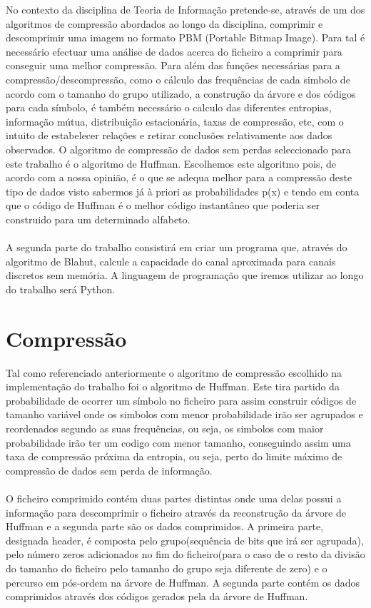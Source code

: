 No contexto da disciplina de Teoria de Informação pretende-se, através de um dos algoritmos de compressão abordados ao longo da disciplina, comprimir e descomprimir uma imagem no formato PBM (Portable Bitmap Image). Para tal é necessário efectuar uma análise de dados acerca do ficheiro a comprimir para conseguir uma melhor compressão. Para além das funções necessárias para a compressão/descompressão, como o cálculo das frequências de cada simbolo de acordo com o tamanho do grupo utilizado, a construção da árvore e dos códigos para cada símbolo, é também necessário o calculo das diferentes entropias, informação mútua, distribuição estacionária, taxas de compressão, etc, com o intuito de estabelecer relações e retirar conclusões relativamente aos dados observados. O algoritmo de compressão de dados sem perdas seleccionado para este trabalho é o algoritmo de Huffman. Escolhemos este algoritmo pois, de acordo com a nossa opinião, é o que se adequa melhor para a compressão deste tipo de dados visto sabermos já à priori as probabilidades p(x) e tendo em conta que o código de Huffman é o melhor código instantâneo que poderia ser construido para um determinado alfabeto. \\
\\A segunda parte do trabalho consistirá em criar um programa que, através do algoritmo de Blahut, calcule a capacidade do canal aproximada para canais discretos sem memória. A linguagem de programação que iremos utilizar ao longo do trabalho será Python. \\

\newpage

\section{Compressão}
 Tal como referenciado anteriormente o algoritmo de compressão escolhido na implementação do trabalho foi o algoritmo de Huffman. Este tira partido da probabilidade de ocorrer um símbolo no ficheiro para assim construir códigos de tamanho variável onde os simbolos com menor probabilidade irão ser agrupados e reordenados segundo as suas frequências, ou seja, os simbolos com maior probabilidade irão ter um codigo com menor tamanho, conseguindo assim uma taxa de compressão próxima da entropia, ou seja, perto do limite máximo de compressão de dados sem perda de informação.\\
 \\
 O ficheiro comprimido contém duas partes distintas onde uma delas possui a informação para descomprimir o ficheiro através da reconstrução da árvore de Huffman e a segunda parte são os dados comprimidos. A primeira parte, designada header, é composta pelo grupo(sequência de bits que irá ser agrupada), pelo número zeros adicionados no fim do ficheiro(para o caso de o resto da divisão do tamanho do ficheiro pelo tamanho do grupo seja diferente de zero) e o percurso em pós-ordem na árvore de Huffman. A segunda parte contém os dados comprimidos através dos códigos gerados pela da árvore de Huffman.\\
